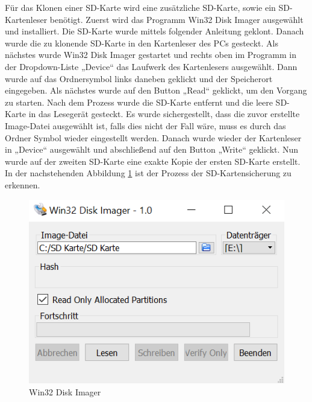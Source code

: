 Für das Klonen einer SD-Karte wird eine zusätzliche SD-Karte, sowie ein SD-Kartenleser benötigt. Zuerst wird das Programm Win32 Disk Imager ausgewählt und installiert. Die SD-Karte wurde mittels folgender Anleitung geklont. \parencite{SD-Kartenklonen}
Danach wurde die zu klonende SD-Karte in den Kartenleser des PCs gesteckt. Als nächstes wurde Win32 Disk Imager gestartet und rechts oben im Programm in der Dropdown-Liste „Device“ das Laufwerk des Kartenlesers ausgewählt. Dann wurde auf das Ordnersymbol links daneben geklickt und der Speicherort eingegeben. Als nächstes wurde auf den Button „Read“ geklickt, um den Vorgang zu starten. Nach dem Prozess wurde die SD-Karte entfernt und die leere SD-Karte in das Lesegerät gesteckt. Es wurde sichergestellt, dass die zuvor erstellte Image-Datei ausgewählt ist, falls dies nicht der Fall wäre, muss es durch das Ordner Symbol wieder eingestellt werden. Danach wurde wieder der Kartenleser in „Device“ ausgewählt und abschließend auf den Button „Write“ geklickt. Nun wurde auf der zweiten SD-Karte eine exakte Kopie der ersten SD-Karte erstellt. In der nachstehenden Abbildung \ref{fig:Win32 Disk Imager} ist der Prozess der SD-Kartensicherung zu erkennen.

\begin{figure}[H]
	\centering
	\includegraphics[width=0.5\linewidth]{images/Win32 Disk Imager.png}
	\caption[Win32 Disk Imager]{Win32 Disk Imager}
	\label{fig:Win32 Disk Imager}
\end{figure}

\newpage
